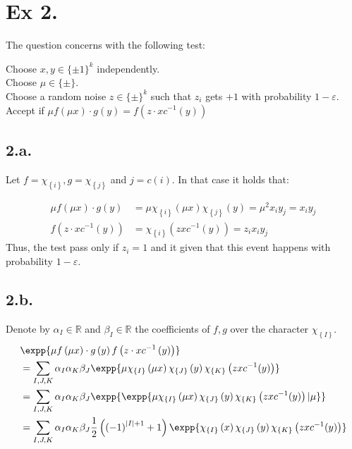 \documentclass{article}
\newcommand{\Chi}[1]{\chi_{ \left\{ #1  \right\} } }
\begin{document}
\section{Ex 2.}
The question concerns with the following test: 

\begin{algorithm}[H]
  Choose $x,y \in \{\pm1\}^{k}$ independently. \\
  Choose $\mu \in \{\pm\}$. \\ 
  Choose a random noise $z \in \{\pm\}^{k}$ such that $z_{i}$ gets $+1$ with probability $1-\varepsilon$.  \\
  Accept if $\mu f\left( \mu x \right) \cdot g\left( y \right) = f\left(z \cdot x c^{-1}\left( y \right)  \right)$

\end{algorithm}


\subsection{2.a.} Let $f = \Chi{i}, g = \Chi{j}$ and $j = c(i)$. In that case it holds that: 

\begin{equation*}
  \begin{split}
    \mu f\left( \mu x \right) \cdot g\left( y \right)  &= \mu \Chi{i}\left( \mu x \right)\Chi{j}\left( y \right) = \mu^{2}x_{i}y_{j} = x_{i}y_{j} \\ 
    f\left(z \cdot x c^{-1}\left( y \right)  \right) & = \Chi{i}\left( zx c^{-1}(y) \right) = z_{i}x_{i}y_{j} 
  \end{split}
\end{equation*}
Thus, the test pass only if $z_{i} = 1$ and it given that this event happens with probability $1-\varepsilon$. 

\subsection{2.b.} 
Denote by $\alpha_{I} \in \mathbb{R}$ and $\beta_{I} \in \mathbb{R}$ the coefficients of $f,g$ over the character $\Chi{I}$.  
\begin{equation*}
  \begin{split}
    & \expp{\mu f\left( \mu x \right) \cdot g\left( y \right)f\left(z \cdot x c^{-1}\left( y \right)  \right)} \\
    & = \sum_{I,J,K}\alpha_{I}\alpha_{K}\beta_{J}\expp{ \mu \Chi{I}\left( \mu x \right)\Chi{J}\left( y \right) \Chi{K}\left( zx c^{-1}(y) \right) } \\
    & = \sum_{I,J,K}\alpha_{I}\alpha_{K}\beta_{J}\expp{\expp{ \mu \Chi{I}\left( \mu x \right)\Chi{J}\left( y \right) \Chi{K}\left( zx c^{-1}(y) \right)|\mu}} \\ 
    & = \sum_{I,J,K}\alpha_{I}\alpha_{K}\beta_{J}\frac{1}{2}\left( \left( - 1 \right)^{|I|+1}  + 1\right) \expp{  \Chi{I}\left(  x \right)\Chi{J}\left( y \right) \Chi{K}\left( zx c^{-1}(y) \right) }  
  \end{split}
\end{equation*}
\end{document}
